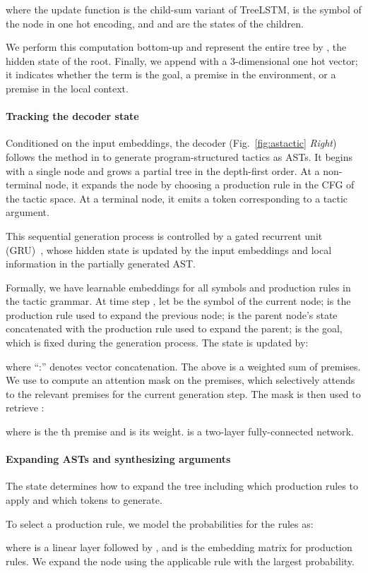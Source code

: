 \documentclass{article}
\newcommand{\smallsec}[1]{\vspace{-3mm} \paragraph{#1}}
\begin{document}
where the update function  is the child-sum variant of TreeLSTM,  is the symbol of the node in one hot encoding, and  and  are the states of the children.

We perform this computation bottom-up and represent the entire tree by , the hidden state of the root.
Finally, we append  with a 3-dimensional one hot vector;
it indicates whether the term is the goal, a premise in the environment, or a premise in the local context.


\smallsec{Tracking the decoder state}
Conditioned on the input embeddings, the decoder (Fig.~\ref{fig:astactic} \textit{Right}) follows the method in \citet{yin2017syntactic} to generate program-structured tactics as ASTs.
It begins with a single node and grows a partial tree in the depth-first order. At a non-terminal node, it expands the node by choosing a production rule in the CFG of the tactic space. At a terminal node, it emits a token corresponding to a tactic argument.

This sequential generation process is controlled by a gated recurrent unit (GRU)~\cite{cho2014learning}, whose hidden state is updated by the input embeddings and local information in the partially generated AST. 

Formally, we have learnable embeddings for all symbols and production rules in the tactic grammar. At time step , let  be the symbol of the current node;
 is the production rule used to expand the previous node;  is the parent node's state concatenated with the production rule used to expand the parent;
 is the goal, which is fixed during the generation process.
The state  is updated by:

where ``:'' denotes vector concatenation. 
The  above is a weighted sum of premises.
We use  to compute an attention mask on the premises, which selectively attends to the relevant premises for the current generation step.
The mask is then used to retrieve :

where  is the th premise and  is its weight. 
 is a two-layer fully-connected network.







\smallsec{Expanding ASTs and synthesizing arguments}
The state  determines how to expand the tree including which production rules to apply and which tokens to generate.

To select a production rule, we model the probabilities for the rules as:

where  is a linear layer followed by , and 
 is the embedding matrix for production rules.
We expand the node using the applicable rule with the largest probability.
\end{document}
